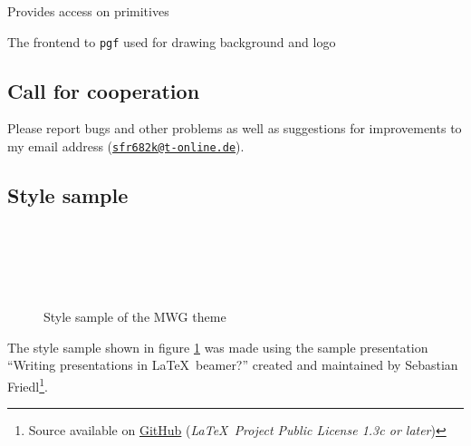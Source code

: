 \documentclass[11pt]{ltxdoc}
\begin{document}
	\medskip
	Provides access on  primitives
	
    \medskip
    The frontend to \texttt{pgf} used for drawing background and logo
	
	
	\subsection*{Call for cooperation}
	Please report bugs and other problems as well as suggestions for improvements to my email address (\href{mailto:sfr682k@t-online.de}{\texttt{sfr682k@t-online.de}}).
	
	
	\subsection*{Style sample}
	\begin{figure} \centering
		~~~ \\[.5em]
		~~~ \\[.5em]
		~~~ \\[.5em]
		~~~
		
		\caption{Style sample of the MWG theme}
		\label{stylesample}
	\end{figure}
	
	The style sample shown in figure \ref{stylesample} was made using the sample presentation \enquote{Writing presentations in \LaTeX\ beamer?} created and maintained by Sebastian Friedl\footnote{Source available on \href{https://github.com/SFr682k/sample-latex-beamer-presentation}{GitHub} (\textit{\LaTeX\ Project Public License 1.3c or later})}.
	
	
\end{document}
